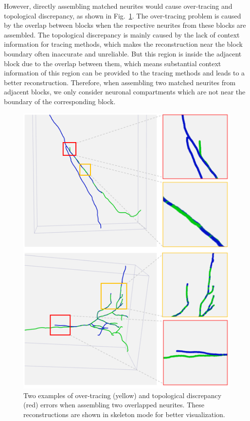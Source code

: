 However, directly assembling matched neurites would cause over-tracing and topological discrepancy, as shown in Fig.~\ref{fig:overlap_discrepancy}.
The over-tracing problem  is caused by the overlap between blocks when the respective neurites from these blocks are assembled.
The topological discrepancy  is mainly caused by the lack of context information for tracing methods, which makes the reconstruction near the block boundary often inaccurate and unreliable.
But this region is inside the adjacent block due to the overlap between them, which means substantial context information of this region can be provided to the tracing methods and leads to a better reconstruction.
Therefore, when assembling two matched neurites from adjacent blocks, we only consider neuronal compartments which are not near the boundary of the corresponding block. 

\begin{figure}[th]
	\centering
	\includegraphics[width=1\columnwidth]{./Illustrations/neuorns_fusion5.png}
	\caption{
		Two examples of over-tracing (yellow) and topological discrepancy (red) errors when assembling two overlapped neurites. These reconstructions are shown in skeleton mode for better visualization. }
	\label{fig:overlap_discrepancy}
\end{figure}

